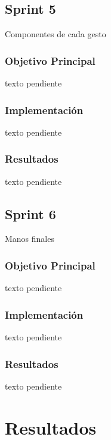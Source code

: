 \documentclass[a4paper, 12pt]{book}
\begin{document}
\section{Sprint 5}
\label{sec:sprint5}
Componentes de cada gesto

\subsection{Objetivo Principal}
\label{subsec:objetivo-principal5}
texto pendiente

\subsection{Implementación}
\label{subsec:implementacion5}
texto pendiente

\subsection{Resultados}
\label{subsec:resultados5}
texto pendiente

\section{Sprint 6}
\label{sec:sprint6}
Manos finales

\subsection{Objetivo Principal}
\label{subsec:objetivo-principal6}
texto pendiente

\subsection{Implementación}
\label{subsec:implementacion6}
texto pendiente

\subsection{Resultados}
\label{subsec:resultados6}
texto pendiente


\cleardoublepage
\chapter{Resultados}
\label{chap:resultados}
\end{document}
